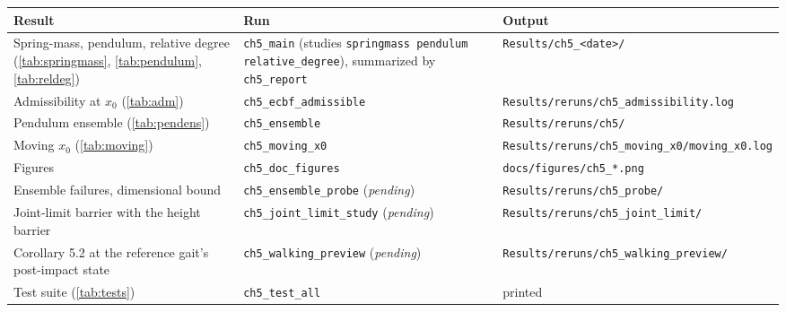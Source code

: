 \documentclass[10pt,twocolumn]{article}
\begin{document}
\begin{latin}
\footnotesize
\setlength{\tabcolsep}{4pt}
\begin{tabular}{p{}p{}p{}}
    \toprule
    Result & Run & Output \\
    \midrule
    Spring-mass, pendulum, relative degree
        (\ref{tab:springmass}, \ref{tab:pendulum}, \ref{tab:reldeg}) &
        \texttt{ch5\_main} (studies \texttt{springmass pendulum relative\_degree}), summarized by \texttt{ch5\_report} &
        \texttt{Results/ch5\_<date>/} \\
    Admissibility at $x_0$ (\ref{tab:adm}) &
        \texttt{ch5\_ecbf\_admissible} & \texttt{Results/reruns/ch5\_admissibility.log} \\
    Pendulum ensemble (\ref{tab:pendens}) &
        \texttt{ch5\_ensemble} & \texttt{Results/reruns/ch5/} \\
    Moving $x_0$ (\ref{tab:moving}) &
        \texttt{ch5\_moving\_x0} & \texttt{Results/reruns/ch5\_moving\_x0/moving\_x0.log} \\
    Figures &
        \texttt{ch5\_doc\_figures} & \texttt{docs/figures/ch5\_*.png} \\
    Ensemble failures, dimensional bound &
        \texttt{ch5\_ensemble\_probe} (\emph{pending}) & \texttt{Results/reruns/ch5\_probe/} \\
    Joint-limit barrier with the height barrier &
        \texttt{ch5\_joint\_limit\_study} (\emph{pending}) & \texttt{Results/reruns/ch5\_joint\_limit/} \\
    Corollary 5.2 at the reference gait's post-impact state &
        \texttt{ch5\_walking\_preview} (\emph{pending}) & \texttt{Results/reruns/ch5\_walking\_preview/} \\
    Test suite (\ref{tab:tests}) &
        \texttt{ch5\_test\_all} & printed \\
    \bottomrule
\end{tabular}
\end{latin}
\end{document}
